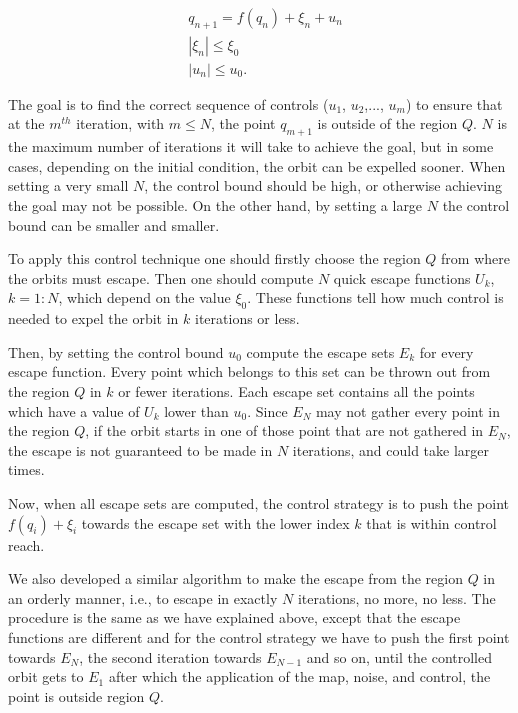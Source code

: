 \begin{equation}
\begin{split}
&q_{n+1}=f(q_n)+\xi_n+u_n \\
&|\xi_n|\leq \xi_0 \\
&|u_n|\leq u_0.
\end{split}
\end{equation}

The goal is to find the correct sequence of controls ($u_1$, $u_2$,..., $u_m$) to ensure that at the $m^{th}$ iteration, with $m \leq N$, the point $q_{m+1}$ is outside of the region $Q$. $N$ is the maximum number of iterations it will take to achieve the goal, but in some cases, depending on the initial condition, the orbit can be expelled sooner. When setting a very small $N$, the control bound should be high, or otherwise achieving the goal may not be possible. On the other hand, by setting a large $N$ the control bound can be smaller and smaller.

To apply this control technique one should firstly choose the region $Q$ from where the orbits must escape. Then one should compute $N$ quick escape functions $U_k$, $k = 1:N$, which depend on the value $\xi_0$. These functions tell how much control is needed to expel the orbit in $k$ iterations or less.

Then, by setting the control bound $u_0$ compute the escape sets $E_k$ for every escape function. Every point which belongs to this set can be thrown out from the region $Q$ in $k$ or fewer iterations. Each escape set contains all the points which have a value of $U_k$ lower than $u_0$. Since $E_N$ may not gather every point in the region $Q$, if the orbit starts in one of those point that are not gathered in $E_N$, the escape is not guaranteed to be made in $N$ iterations, and could take larger times.

Now, when all escape sets are computed, the control strategy is to push the point $f(q_i) + \xi_i$ towards the escape set with the lower index $k$ that is within control reach.

We also developed a similar algorithm to make the escape from the region $Q$ in an orderly manner, i.e., to escape in exactly $N$ iterations, no more, no less. The procedure is the same as we have explained above, except that the escape functions are different and for the control strategy we have to push the first point towards $E_N$, the second iteration towards $E_{N-1}$ and so on, until the controlled orbit gets to $E_1$ after which the application of the map, noise, and control, the point is outside region $Q$.


